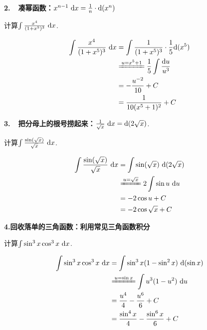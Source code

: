 \textbf{2.~~凑幂函数：$x^{n-1}~\mathrm{d} x =\frac{1}{n} \cdot \mathrm{d} (x^{n})$}

\begin{example}
\label{ex:ch03-04}
计算$\int \frac{x^4}{(1+x^5)^3}~\mathrm{d} x$.
\end{example}

\begin{solution}
\begin{align*}
    \begin{aligned}
        \int \frac{x^4}{(1+x^5)^3}~\d x
        &= \int \frac{1}{(1+x^5)^3}\cdot \frac{1}{5}\d (x^5) \\
        &\xlongequal{u=x^5+1} \frac{1}{5} \int \frac{\d u}{u^3} \\
        &= -\frac{u^{-2}}{10} +C \\
        &= \frac{1}{10(x^5+1)^2} + C
        \nonumber
    \end{aligned}
\end{align*}
\end{solution}

\clearpage

\textbf{3.~~把分母上的根号捞起来：$\frac{1}{\sqrt{x}}~\mathrm{d} x = \mathrm{d} (2\sqrt{x})$}.

\begin{example}
\label{ex:ch03-05}
计算$\int \frac{\sin(\sqrt{x})}{\sqrt{x}}~\mathrm{d} x$.
\end{example}

\begin{solution}
\begin{equation}
    \begin{aligned}
        \int \frac{\sin(\sqrt{x})}{\sqrt{x}}~\d x
        &= \int \sin(\sqrt{x})~\d(2\sqrt{x}) \\
        &\xlongequal{u=\sqrt{x}}  2\int \sin{u} ~\d u \\
        &= -2\cos{u} + C \\
        &= -2\cos{\sqrt{x}} +C
        \nonumber
    \end{aligned}
\end{equation}
\end{solution}

\textbf{4.回收落单的三角函数：利用常见三角函数积分}

\begin{example}
\label{ex:ch03-06}
计算$\int \sin^3 x \cos^3 x ~\mathrm{d} x$.
\end{example}

\begin{solution}
\begin{equation}
    \begin{aligned}
        \int \sin^3 x \cos^3 x ~\d x
        &= \int \sin^3 x (1-\sin^2 x) ~\d (\sin x) \\
        &\xlongequal{u = \sin x} \int u^3(1-u^2) ~\d u \\
        &= \frac{u^4}{4}-\frac{u^6}{6} +C \\
        &= \frac{\sin^4 x}{4} - \frac{\sin^6 x}{6} + C
        \nonumber
    \end{aligned}
\end{equation}
\end{solution}

